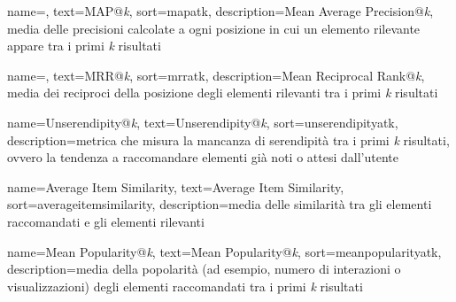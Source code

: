  {
    name=,
    text=MAP@\emph{k},
    sort=mapatk,
    description={Mean Average Precision@\emph{k}, media delle precisioni calcolate a ogni posizione in cui un elemento rilevante appare tra i primi \emph{k} risultati}
}

 {
    name=,
    text=MRR@\emph{k},
    sort=mrratk,
    description={Mean Reciprocal Rank@\emph{k}, media dei reciproci della posizione degli elementi rilevanti tra i primi \emph{k} risultati}
}

 {
    name=Unserendipity@\emph{k},
    text=Unserendipity@\emph{k},
    sort=unserendipityatk,
    description={metrica che misura la mancanza di serendipità tra i primi \emph{k} risultati, ovvero la tendenza a raccomandare elementi già noti o attesi dall'utente}
}

 {
    name=Average Item Similarity,
    text=Average Item Similarity,
    sort=averageitemsimilarity,
    description={media delle similarità tra gli elementi raccomandati e gli elementi rilevanti}
}

 {
    name=Mean Popularity@\emph{k},
    text=Mean Popularity@\emph{k},
    sort=meanpopularityatk,
    description={media della popolarità (ad esempio, numero di interazioni o visualizzazioni) degli elementi raccomandati tra i primi \emph{k} risultati}
}
